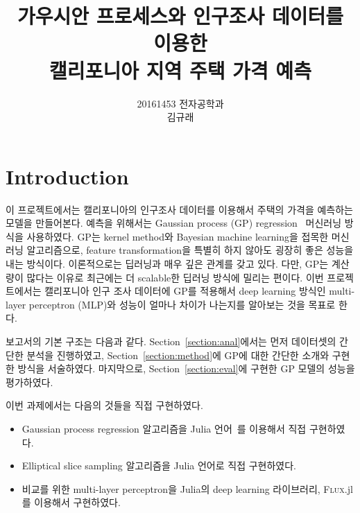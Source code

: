 \documentclass[ba]{imsart}
\begin{document}

\begin{frontmatter}
  \title{가우시안 프로세스와 인구조사 데이터를 이용한 \\ 캘리포니아 지역 주택 가격 예측}

\runtitle{}

\begin{aug}
  \author{20161453 전자공학과\\김규래}%
  \address{}


\end{aug}




\end{frontmatter}

\section{Introduction}\label{}
이 프로젝트에서는 캘리포니아의 인구조사 데이터를 이용해서 주택의 가격을 예측하는 모델을 만들어본다.
예측을 위해서는 Gaussian process (GP) regression~\citep{rasmussen_gaussian_2006} 머신러닝 방식을 사용하였다.
GP는 kernel method와 Bayesian machine learning을 접목한 머신러닝 알고리즘으로, feature transformation을 특별히 하지 않아도 굉장히 좋은 성능을 내는 방식이다.
이론적으로는 딥러닝과 매우 깊은 관계를 갖고 있다.
다만, GP는 계산량이 많다는 이유로 최근에는 더 scalable한 딥러닝 방식에 밀리는 편이다.
이번 프로젝트에서는 캘리포니아 인구 조사 데이터에 GP를 적용해서 deep learning 방식인 multi-layer perceptron (MLP)와 성능이 얼마나 차이가 나는지를 알아보는 것을 목표로 한다.

보고서의 기본 구조는 다음과 같다.
Section~\ref{section:anal}에서는 먼저 데이터셋의 간단한 분석을 진행하였고, Section~\ref{section:method}에 GP에 대한 간단한 소개와 구현한 방식을 서술하였다.
마지막으로, Section~\ref{section:eval}에 구현한 GP 모델의 성능을 평가하였다.

이번 과제에서는 다음의 것들을 직접 구현하였다.
\begin{itemize}
  \item Gaussian process regression 알고리즘을 Julia 언어~\citep{bezanson_julia_2017}를 이용해서 직접 구현하였다.
  \item Elliptical slice sampling 알고리즘을 Julia 언어로 직접 구현하였다.
  \item 비교를 위한 multi-layer perceptron을 Julia의 deep learning 라이브러리, \textsc{Flux}.jl를 이용해서 구현하였다.
\end{itemize}
\end{document}
